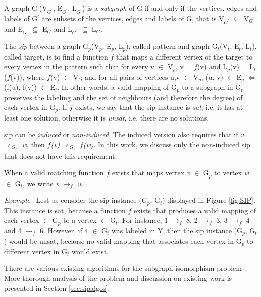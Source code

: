 \documentclass{l4proj}
\newcounter{example}[section]
\newenvironment{example}[1][]{\refstepcounter{example}\par\medskip
   \noindent \textit{Example~\theexample #1} \rmfamily}{\medskip}
\begin{document}
A graph G$^{\prime}$(V$_{G^{\prime}}$, E$_{G^{\prime}}$, L$_{G^{\prime}}$) is a \textit{subgraph} of G if and only if the vertices, edges and labels of G$^{\prime}$ are subsets of the vertices, edges and labels of G, that is V$_{G^{\prime}}$ $\subseteq$ V$_{G}$ and E$_{G^{\prime}}$ $\subseteq$ E$_{G}$ and L$_{G^{\prime}}$ $\subseteq$ L$_{G}$.

The \textit{\gls{sip}} between a graph G$_{p}$(V$_{p}$, E$_{p}$, L$_{p}$), called pattern and graph G$_{t}$(V$_{t}$, E$_{t}$, L$_{t}$), called target, is to find a function $f$ that maps a different vertex of the target to every vertex in the pattern such that for every v $\in$ V$_{p}$, v = $f$(v) and L$_{p}$(v) = L$_{t}$($f$(v)), where $f$(v) $\in$ V$_{t}$; and for all pairs of vertices u,v $\in$ V$_{p}$, (u, v) $\in$ E$_{p}$ $\Leftrightarrow$ (f(u), f(v)) $\in$ E$_{t}$. In other words, a valid mapping of G$_{p}$ to a subgraph in G$_{t}$ preserves the labeling and the set of neighbours (and therefore the degree) of each vertex in G$_{p}$. If $f$ exists, we say that the \gls{sip} instance is \textit{\gls{sat}}, i.e. it has at least one solution, otherwise it is \textit{\gls{unsat}}, i.e. there are no solutions.

\gls{sip} can be \textit{induced} or \textit{non-induced}. The induced version also requires that if \textit{v} $\nsim_{G_{p}}$ \textit{w}, then \textit{$f$(v)} $\nsim_{G_{t}}$ \textit{$f$(w)}. In this work, we discuss only the non-induced \gls{sip} that does not have this requirement.

When a valid matching function $f$ exists that maps vertex \textit{v} $\in$ G$_{p}$ to vertex \textit{w} $\in$ G$_{t}$, we write \textit{v} $\rightarrow_{f}$ \textit{w}. 

\begin{example}
Lest us consider the \gls{sip} instance (G$_{p}$, G$_{t}$) displayed in Figure \ref{fig:SIP}. This instance is \gls{sat}, because a function $f$ exists that produces a valid mapping of each vertex $\in$ G$_{p}$ to a vertex $\in$ G$_{t}$. For instance, 1 $\rightarrow_{f}$ 8, 2 $\rightarrow_{f}$ 3, 3 $\rightarrow_{f}$ 4 and 4 $\rightarrow_{f}$ 6. However, if 4 $\in$ G$_{t}$ was labeled in Y, then the \gls{sip} instance (G$_{p}$, G$_{t}$) would be \gls{unsat}, because no valid mapping that associates each vertex in G$_{p}$ to different vertex in G$_{t}$ would exist.
\end{example}

There are various existing algorithms for the subgraph isomorphism problem \cite{vf2,Solnon:2010,CP2015,Larrosa:2002,Bonnici:2013,Zampelli:2010}. More thorough analysis of the problem and discussion on existing work is presented in Section \ref{sec:sipalgos}.
\end{document}
